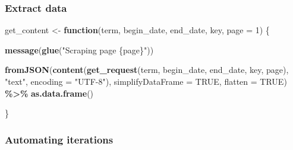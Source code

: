 \documentclass[
]{book}
\newenvironment{Shaded}{\begin{snugshade}}{\end{snugshade}}
\newcommand{\ControlFlowTok}[1]{\textcolor[rgb]{0.13,0.29,0.53}{\textbf{#1}}}
\newcommand{\DataTypeTok}[1]{\textcolor[rgb]{0.13,0.29,0.53}{#1}}
\newcommand{\DecValTok}[1]{\textcolor[rgb]{0.00,0.00,0.81}{#1}}
\newcommand{\KeywordTok}[1]{\textcolor[rgb]{0.13,0.29,0.53}{\textbf{#1}}}
\newcommand{\NormalTok}[1]{#1}
\newcommand{\OperatorTok}[1]{\textcolor[rgb]{0.81,0.36,0.00}{\textbf{#1}}}
\newcommand{\OtherTok}[1]{\textcolor[rgb]{0.56,0.35,0.01}{#1}}
\newcommand{\StringTok}[1]{\textcolor[rgb]{0.31,0.60,0.02}{#1}}
\begin{document}
\hypertarget{extract-data}{%
\subsubsection{Extract data}\label{extract-data}}

\begin{Shaded}
\begin{Highlighting}[]
\NormalTok{get\_content \textless{}{-}}\StringTok{ }\ControlFlowTok{function}\NormalTok{(term, begin\_date, end\_date, key, }\DataTypeTok{page =} \DecValTok{1}\NormalTok{) \{}

    \KeywordTok{message}\NormalTok{(}\KeywordTok{glue}\NormalTok{(}\StringTok{"Scraping page \{page\}"}\NormalTok{))}

    \KeywordTok{fromJSON}\NormalTok{(}\KeywordTok{content}\NormalTok{(}\KeywordTok{get\_request}\NormalTok{(term, begin\_date, end\_date, key, page),}
                     \StringTok{"text"}\NormalTok{,}
                \DataTypeTok{encoding =} \StringTok{"UTF{-}8"}\NormalTok{),}
                \DataTypeTok{simplifyDataFrame =} \OtherTok{TRUE}\NormalTok{, }\DataTypeTok{flatten =} \OtherTok{TRUE}\NormalTok{) }\OperatorTok{\%\textgreater{}\%}\StringTok{ }\KeywordTok{as.data.frame}\NormalTok{()}

\NormalTok{\}}
\end{Highlighting}
\end{Shaded}

\hypertarget{automating-iterations}{%
\subsubsection{Automating iterations}\label{automating-iterations}}
\end{document}
